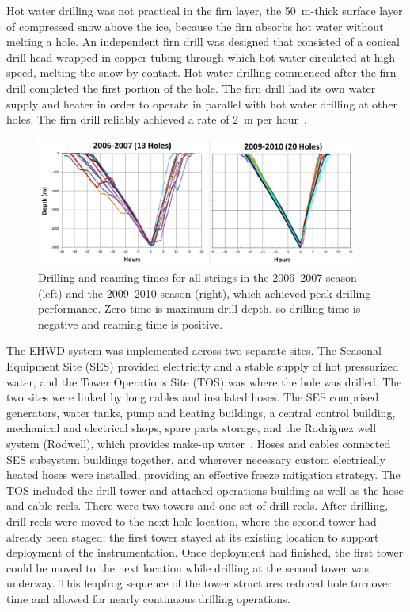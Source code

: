 Hot water drilling was not practical in the firn layer, the 50~m-thick surface layer of
compressed snow above the ice, because the firn
absorbs hot water without melting a hole.  An independent
firn drill was designed that consisted of a conical drill
head wrapped in copper tubing through which hot water circulated at high speed,
melting the snow by contact. Hot water drilling commenced after the firn
drill completed the first portion of the hole. The firn drill had its own
water supply and heater in order to operate in parallel with hot water drilling
at other holes. The firn drill reliably achieved a rate of 2~m per hour~\cite{ehwd}.

\begin{figure}[!ht]
 \centering
 \includegraphics[width=0.95\textwidth]{graphics/drill/drill_depthvtime.pdf}
\caption{Drilling and reaming times for all strings in the 2006--2007 season
  (left) and the 2009--2010 season (right), which achieved peak drilling
  performance. Zero time is maximum drill depth, so drilling time is
  negative and reaming time is positive.}
\label{fig:drilldepthtime}
\end{figure}

The EHWD system was implemented across two separate sites.  The Seasonal
Equipment Site (SES) provided electricity and a stable supply of hot
pressurized water, and the Tower Operations Site (TOS) was where the hole
was drilled.  The two sites were linked by long cables and insulated
hoses. The SES comprised generators, water tanks, pump and heating
buildings, a central control building, mechanical and electrical shops,
spare parts storage, and the Rodriguez well system (Rodwell), which
provides make-up water~\cite{rodriguez_well}. Hoses and cables connected SES subsystem buildings together, and
wherever necessary custom electrically heated hoses were installed,
providing an effective freeze mitigation strategy. The TOS included the
drill tower and attached operations building as well as the hose and cable
reels.  There were two towers and one set of drill reels.  After drilling,
drill reels were moved to the next hole location, where the second tower
had already been staged; the first tower stayed at its existing location
to support deployment of the instrumentation.  Once deployment had
finished, the first tower could be moved to the next location while
drilling at the second tower was underway.  This leapfrog sequence of the
tower structures reduced hole turnover time and allowed for nearly
continuous drilling operations.

